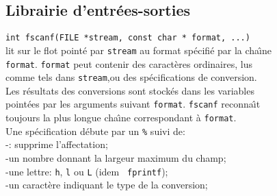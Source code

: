 \begin{frame}
    \section{Librairie d'entr\'ees-sorties}


{\tt int fscanf(FILE *stream, const char * format, ...)}\\
lit sur le flot point\'e par {\tt stream} au format sp\'ecifi\'e par la
cha\^\i{}ne \\
{\tt format}. {\tt format} peut contenir des caract\`eres
ordinaires, lus\\
 comme tels dans {\tt stream},ou des sp\'ecifications de conversion. \\
 Les r\'esultats des conversions sont stock\'es dans les 
variables \\
point\'ees par les arguments suivant {\tt format}. {\tt fscanf} reconna\^\i{}t \\
toujours la plus longue cha\^\i{}ne correspondant \`a {\tt format}. \\
Une sp\'ecification d\'ebute par un {\tt \%} suivi de:\\
\hspace*{5mm}-{\tt *}: supprime l'affectation;\\
\hspace*{5mm}-un nombre donnant la largeur maximum du champ;\\
\hspace*{5mm}-une lettre: {\tt h}, {\tt l} ou {\tt L} (idem {\tt
  fprintf});\\
\hspace*{5mm}-un caract\`ere indiquant le type de la conversion; 


\end{frame}
